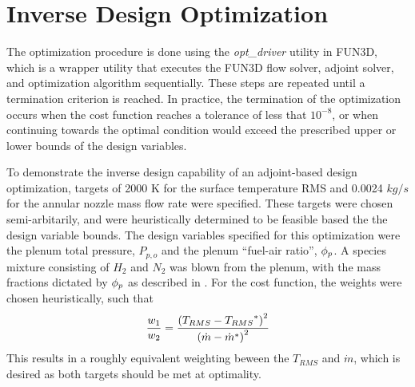 \section{Inverse Design Optimization}
\label{inv-design-opt}

The optimization procedure is done using the \textit{opt\_driver} utility in
FUN3D, which is a wrapper utility that executes the FUN3D flow solver, adjoint
solver, and optimization algorithm sequentially.  These steps are repeated until
a termination criterion is reached.  In practice, the termination of the
optimization occurs when the cost function reaches a tolerance of less that
$10^{-8}$, or when continuing towards the optimal condition would exceed the
prescribed upper or lower bounds of the design variables.

To demonstrate the inverse design capability of an adjoint-based design
optimization, targets of 2000 K for the surface temperature RMS and 0.0024
$kg/s$ for the annular nozzle mass flow rate were specified.  These targets were
chosen semi-arbitarily, and were heuristically determined to be feasible based
the the design variable bounds. The design variables specified for this
optimization were the plenum total pressure, $P_{p,o}$ and the plenum ``fuel-air
ratio'', $\phi_p$.  A species mixture consisting of $H_2$ and $N_2$ was blown from
the plenum, with the mass fractions dictated by $\phi_p$ as described in
.  For the cost function, the weights were chosen
heuristically, such that 
\begin{equation}
  \frac{w_1}{w_2} = \frac{\left( {T_{RMS}} - {T_{RMS}}^{*} \right)^2}{\left( {\dot{m}} - {\dot{m}}^{*} \right)^2}
  \label{weight-ratio}
\end{equation}
This results in a roughly equivalent weighting beween the $T_{RMS}$ and
$\dot{m}$, which is desired as both targets should be met at optimality.
